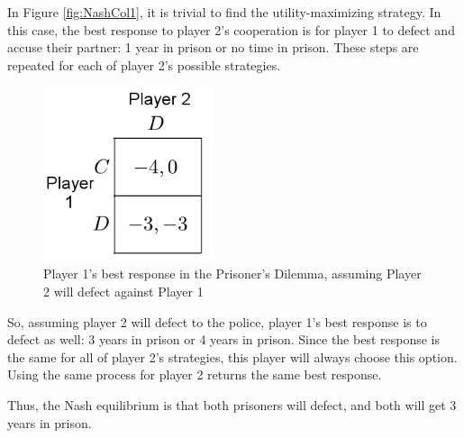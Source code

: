 In Figure \ref{fig:NashCol1}, it is trivial to find the utility-maximizing strategy. In this case, the best response to player 2's cooperation is for player 1 to defect and accuse their partner: 1 year in prison or no time in prison. These steps are repeated for each of player 2's possible strategies.
\begin{figure}[H]
  \centering
  \includegraphics[width=5cm]{figures/ExamplePartialGrid2.png}
  \caption{Player 1's best response in the Prisoner's Dilemma, assuming Player 2 will defect against Player 1}
  \label{fig:NashCol2}
\end{figure}
So, assuming player 2 will defect to the police, player 1's best response is to defect as well: 3 years in prison or 4 years in prison. Since the best response is the same for all of player 2's strategies, this player will always choose this option. Using the same process for player 2 returns the same best response.

Thus, the Nash equilibrium is that both prisoners will defect, and both will get 3 years in prison. 

